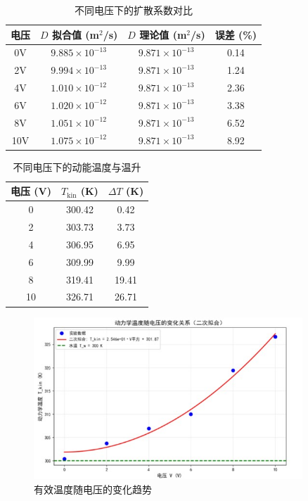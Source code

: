 \documentclass[a4paper]{report} %
\begin{document}
\begin{table}[H]
    \centering
    \caption{不同电压下的扩散系数对比}
    \begin{tabular}{cccc}
        \toprule
        电压 & $D$ 拟合值 (m$^2$/s) & $D$ 理论值 (m$^2$/s) & 误差 (\%) \\
        \midrule
        0V  & $9.885 \times 10^{-13}$ & $9.871 \times 10^{-13}$ & 0.14 \\
        2V  & $9.994 \times 10^{-13}$ & $9.871 \times 10^{-13}$ & 1.24 \\
        4V  & $1.010 \times 10^{-12}$ & $9.871 \times 10^{-13}$ & 2.36 \\
        6V  & $1.020 \times 10^{-12}$ & $9.871 \times 10^{-13}$ & 3.38 \\
        8V  & $1.051 \times 10^{-12}$ & $9.871 \times 10^{-13}$ & 6.52 \\
        10V & $1.075 \times 10^{-12}$ & $9.871 \times 10^{-13}$ & 8.92 \\
        \bottomrule
    \end{tabular}
\end{table}
\begin{table}[H]
    \centering
    \caption{不同电压下的动能温度与温升}
    \begin{tabular}{ccc}
        \toprule
        电压 (V) & $T_{\text{kin}}$ (K) & $\Delta T$ (K) \\
        \midrule
        0  & 300.42 & 0.42 \\
        2  & 303.73 & 3.73 \\
        4  & 306.95 & 6.95 \\
        6  & 309.99 & 9.99 \\
        8  & 319.41 & 19.41 \\
        10 & 326.71 & 26.71 \\
        \bottomrule
    \end{tabular}
\end{table}
\begin{figure}[H]
    \centering
    \includegraphics[width=0.9\textwidth]{温度.jpg}
    \caption{有效温度随电压的变化趋势}
    \label{fig:trends}
\end{figure}
\end{document}
